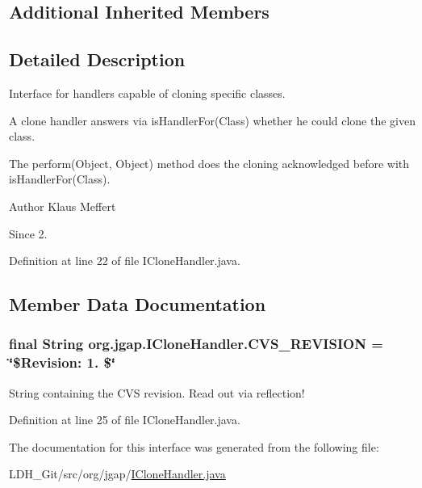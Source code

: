 \subsection*{Additional Inherited Members}


\subsection{Detailed Description}
Interface for handlers capable of cloning specific classes.

A clone handler answers via is\-Handler\-For(\-Class) whether he could clone the given class.

The perform(\-Object, Object) method does the cloning acknowledged before with is\-Handler\-For(\-Class).

\begin{DoxyAuthor}{Author}
Klaus Meffert 
\end{DoxyAuthor}
\begin{DoxySince}{Since}
2. 
\end{DoxySince}


Definition at line 22 of file I\-Clone\-Handler.\-java.



\subsection{Member Data Documentation}
\hypertarget{interfaceorg_1_1jgap_1_1_i_clone_handler_a57398948552c34c664d80aee31960461}{
\subsubsection[{C\-V\-S\-\_\-\-R\-E\-V\-I\-S\-I\-O\-N}]{\setlength{\rightskip}{0pt plus 5cm}final String org.\-jgap.\-I\-Clone\-Handler.\-C\-V\-S\-\_\-\-R\-E\-V\-I\-S\-I\-O\-N = \char`\"{}\$Revision\-: 1. \$\char`\"{}\hspace{0.3cm}{\ttfamily [static]}}}\label{interfaceorg_1_1jgap_1_1_i_clone_handler_a57398948552c34c664d80aee31960461}
String containing the C\-V\-S revision. Read out via reflection! 

Definition at line 25 of file I\-Clone\-Handler.\-java.



The documentation for this interface was generated from the following file\-:\begin{DoxyCompactItemize}
\item 
L\-D\-H\-\_\-\-Git/src/org/jgap/\hyperlink{_i_clone_handler_8java}{I\-Clone\-Handler.\-java}\end{DoxyCompactItemize}

